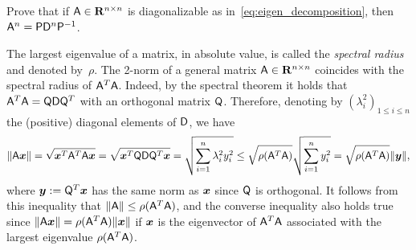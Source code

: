 \begin{exercise}
    Prove that if $\mathsf A \in \mathbf R^{n \times n}$ is diagonalizable as in~\eqref{eq:eigen_decomposition},
    then $\mathsf A^n = \mathsf P \mathsf D^n \mathsf P^{-1}$.
\end{exercise}

The largest eigenvalue of a matrix, in absolute value,
is called the \emph{spectral radius} and denoted by~$\rho$.
The 2-norm of a general matrix $\mathsf A \in \mathbf R^{n \times n}$
coincides with the spectral radius of $\mathsf A^T \mathsf A$.
Indeed, by the spectral theorem it holds that $\mathsf A^T \mathsf A = \mathsf Q \mathsf D \mathsf Q^T$ with an orthogonal matrix $\mathsf Q$.
Therefore, denoting by $(\lambda_i^2)_{1 \leq i \leq n}$ the (positive) diagonal elements of $\mathsf D$,
we have
\begin{equation}
    \label{eq:matrices_link_norm_spectral_radius}
    \lVert\mathsf A \mathbf{\boldsymbol{x}}\rVert
    = \sqrt{\mathbf{\boldsymbol{x}}^T \mathsf A^T \mathsf A \mathbf{\boldsymbol{x}}}
    = \sqrt{\mathbf{\boldsymbol{x}}^T \mathsf Q \mathsf D \mathsf Q^T \mathbf{\boldsymbol{x}}}
    = \sqrt{\sum_{i=1}^{n} \lambda_i^2 y_i^2}
    \leq \sqrt{\rho(\mathsf A^T \mathsf A)} \sqrt{\sum_{i=1}^{n} y_i^2}
    =  \sqrt{\rho(\mathsf A^T \mathsf A)} \lVert\mathbf{\boldsymbol{y}}\rVert,
\end{equation}
where $\mathbf{\boldsymbol{y}} := \mathsf Q^T \mathbf{\boldsymbol{x}}$ has the same norm as $\mathbf{\boldsymbol{x}}$ since $\mathsf Q$ is orthogonal.
It follows from this inequality that $\lVert\mathsf A\rVert \leq \rho(\mathsf A^T \mathsf A)$,
and the converse inequality also holds true since $\lVert\mathsf A \mathbf{\boldsymbol{x}}\rVert = \rho(\mathsf A^T \mathsf A) \lVert\mathbf{\boldsymbol{x}}\rVert$
if $\mathbf{\boldsymbol{x}}$ is the eigenvector of $\mathsf A^T \mathsf A$ associated with the largest eigenvalue $\rho(\mathsf A^T \mathsf A)$.
